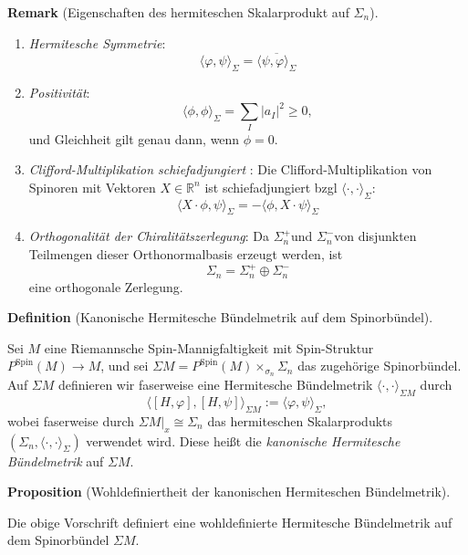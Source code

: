 \documentclass[10pt, letterpaper]{article}
\newcommand{\R}{\mathbb{R}}
\newcommand{\Spin}{\mathrm{Spin}}
\newcommand{\CustomHeading}[3]{%
  \par\medskip\noindent%
  \textbf{#1 #2} \textnormal{(#3)}.\enskip%
}
\newenvironment{DEF}[2]{\CustomHeading{Definition}{#1}{#2}}{}
\newenvironment{PROP}[2]{\CustomHeading{Proposition}{#1}{#2}}{}
\newenvironment{REM}[2]{\CustomHeading{Remark}{#1}{#2}}{}
\begin{document}
\begin{REM}{}{Eigenschaften des hermiteschen Skalarprodukt auf $\Sigma_n$}
  \begin{enumerate}
    \item \emph{Hermitesche Symmetrie}:
    $$\langle\varphi, \psi\rangle_{\Sigma}=\overline{\langle\psi, \varphi\rangle_{\Sigma}}$$
    \item \emph{Positivität}:
    $$
    \langle\phi, \phi\rangle_\Sigma=\sum_I\left|a_I\right|^2 \geq 0,
    $$
    und Gleichheit gilt genau dann, wenn $\phi=0$.
    \item \emph{Clifford-Multiplikation schiefadjungiert} \parencite[89]{BaerSpin}: Die Clifford-Multiplikation von Spinoren mit Vektoren $X\in\R^n$ ist schiefadjungiert bzgl $\langle\cdot,\cdot\rangle_\Sigma$:
    $$\langle X \cdot \phi, \psi\rangle_\Sigma= -\langle\phi, X \cdot  \psi\rangle_\Sigma$$
    \item \emph{Orthogonalität der Chiralitätszerlegung}: Da $\Sigma_n^{+}$und $\Sigma_n^{-}$von disjunkten Teilmengen dieser Orthonormalbasis erzeugt werden, ist
    $$
    \Sigma_n=\Sigma_n^{+} \oplus \Sigma_n^{-}
    $$
    eine orthogonale Zerlegung.
  \end{enumerate}
  
\end{REM}




\begin{DEF}{}{Kanonische Hermitesche Bündelmetrik auf dem Spinorbündel}
Sei \(M\) eine Riemannsche Spin-Mannigfaltigkeit mit Spin-Struktur $P^{\Spin}(M)\to M$, und sei $\Sigma M=P^{\Spin}(M)\times_{\sigma_n}\Sigma_n$
das zugehörige Spinorbündel. Auf \(\Sigma M\) definieren wir faserweise eine
Hermitesche Bündelmetrik $\langle\cdot,\cdot\rangle_{\Sigma M}$ durch
\[
\bigl\langle [H,\varphi],[H,\psi]\bigr\rangle_{\Sigma M}
:=
\langle \varphi,\psi\rangle_{\Sigma},
\]
wobei faserweise durch $\Sigma M|_x\cong\Sigma_n$ das hermiteschen Skalarprodukts $(\Sigma_n,\langle\cdot,\cdot\rangle_\Sigma)$ verwendet wird. Diese heißt die
\emph{kanonische Hermitesche Bündelmetrik} auf \(\Sigma M\).
\end{DEF}

\begin{PROP}{}{Wohldefiniertheit der kanonischen Hermiteschen Bündelmetrik}
Die obige Vorschrift definiert eine wohldefinierte Hermitesche Bündelmetrik auf
dem Spinorbündel \(\Sigma M\).
\end{PROP}
\end{document}
